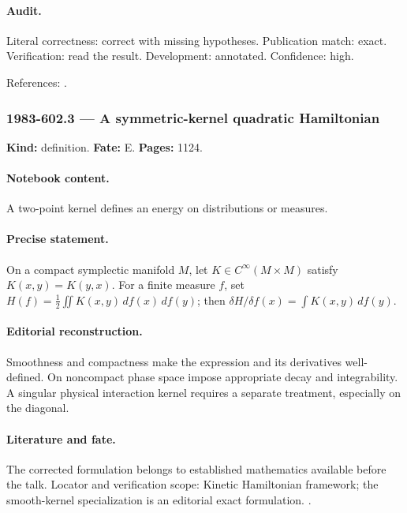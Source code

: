 \paragraph{Audit.} Literal correctness: correct with missing hypotheses. Publication match: exact. Verification: read the result. Development: annotated. Confidence: high.

\noindent References: \citep{morrison1980maxwell}.\par

\subsubsection{1983-602.3 --- A symmetric-kernel quadratic Hamiltonian}

\label{item:1983-602.3}

\noindent\textbf{Kind:} definition. \textbf{Fate:} E. \textbf{Pages:} 1124.\par

\paragraph{Notebook content.} A two-point kernel defines an energy on distributions or measures.

\paragraph{Precise statement.} On a compact symplectic manifold \(M\), let \(K\in C^\infty(M\times M)\) satisfy \(K(x,y)=K(y,x)\). For a finite measure \(f\), set \(H(f)=\frac12\iint K(x,y)\,df(x)\,df(y)\); then \(\delta H/\delta f(x)=\int K(x,y)\,df(y)\).

\paragraph{Editorial reconstruction.} Smoothness and compactness make the expression and its derivatives well-defined. On noncompact phase space impose appropriate decay and integrability. A singular physical interaction kernel requires a separate treatment, especially on the diagonal.

\paragraph{Literature and fate.} The corrected formulation belongs to established mathematics available before the talk. Locator and verification scope: Kinetic Hamiltonian framework; the smooth-kernel specialization is an editorial exact formulation. \cite{morrison1980maxwell}.

